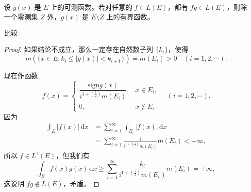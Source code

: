 \documentclass[../../main.tex]{subfiles}%
\begin{document}
\begin{proposition}
设 $g(x)$ 是 $E$ 上的可测函数。若对任意的 $f \in L(E)$，都有 $fg \in L(E)$，则除一个零测集 $Z$ 外，$g(x)$ 是 $E \setminus Z$ 上的有界函数。
\end{proposition}
\begin{remark}
比较.
\end{remark}
\begin{proof}

如果结论不成立，那么一定存在自然数子列 $\{ k_i \}$，使得
\[
m(\{ x \in E : k_i \leqslant |g(x)| < k_{i+1} \}) = m(E_i) > 0 \quad (i = 1, 2, \cdots).
\]

现在作函数
\[
f(x) = 
\begin{cases} 
\dfrac{\text{sign}g(x)}{i^{1 + (\frac{1}{2})} m(E_i)}, & x \in E_i, \\
0, & x \notin E_i 
\end{cases} \quad (i = 1, 2, \cdots).
\]
因为
\begin{align*}
\int_E |f(x)| \, \mathrm{d}x &= \sum_{i=1}^{\infty} \int_{E_i} |f(x)| \, \mathrm{d}x \\
&= \sum_{i=1}^{\infty} \frac{1}{i^{1 + (\frac{1}{2})} m(E_i)} m(E_i) < +\infty,
\end{align*}
所以 $f \in L^1(E)$，但我们有
\[
\int_E f(x)g(x) \, \mathrm{d}x \geqslant \sum_{i=1}^{\infty} \frac{k_i}{i^{1 + (\frac{1}{2})} m(E_i)} m(E_i) = +\infty,
\]
这说明 $fg \notin L(E)$，矛盾。

\end{proof}
\end{document}
